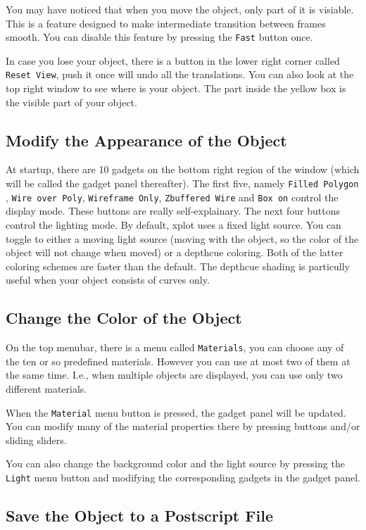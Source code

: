 You may have noticed that when you move the object, only
part of it is visiable. This is a feature 
designed to make intermediate transition
between frames smooth. You can disable this feature by
pressing the \verb+Fast+ button once. 

In case you lose your object, there is a button in the
lower right corner called \verb+Reset View+, push it once
will undo all the translations.  You can also look at the
top right window to see where is your object. The part inside
the yellow box is the visible part of your object.


\subsection{Modify the Appearance of the Object}

At startup, there are 10 gadgets on the bottom right region
of the window (which will be called the gadget panel thereafter).
 The first five, namely
\verb+Filled Polygon +, \verb+Wire over Poly+,
\verb+Wireframe Only+, \verb+Zbuffered Wire+
and \verb+Box on+ control the display mode.  These buttons
are really self-explainary.
The next four buttons control the lighting mode. By default,
xplot uses a fixed light source. You can toggle to either
a moving light source (moving with the object, so the color
of the object will not change when moved)  or a depthcue 
coloring. Both of the latter coloring schemes are faster than
the default. The depthcue shading is particully useful when 
your object consists of curves only.


\subsection{Change the Color of the Object}

On the top menubar, there is a menu called \verb+Materials+,
you can choose any of the ten or so predefined materials.
However you can use at most two of them at the same time. I.e.,
when multiple objects are displayed, you can use only two different
materials.

When the \verb+Material+ menu button is pressed, the gadget panel
will be updated. You can modify many
of the material properties there by pressing buttons and/or  sliding
sliders.

You can also change the background color and the light source
by pressing the \verb+Light+ menu button and modifying the
corresponding gadgets in the gadget panel.

\subsection{Save the Object to a Postscript File}

